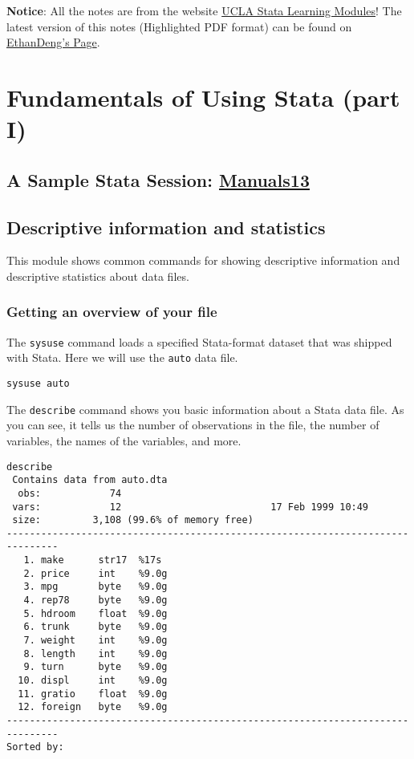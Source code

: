 \textbf{Notice}: All the notes are from the website \href{http://www.ats.ucla.edu/stat/stata/modules/}{UCLA Stata Learning Modules}! The latest version of this notes (Highlighted PDF format) can be found on \href{http://ddswhu.com/}{EthanDeng\rq{}s Page}.

\section{Fundamentals of Using Stata (part I)}

\subsection{A Sample Stata Session: \href{http://www.stata.com/manuals13/gsw1.pdf}{Manuals13}}

\subsection{Descriptive information and statistics}
This module shows common commands for showing descriptive information and descriptive statistics about data files.

\subsubsection{Getting an overview of your file}

The \lstinline{sysuse} command loads a specified Stata-format dataset that was shipped with Stata. Here we will use the \lstinline{auto} data file.

\begin{lstlisting}
sysuse auto
\end{lstlisting}

The \lstinline{describe} command shows you basic information about a Stata data file. As you can see, it tells us the number of observations in the file, the number of variables, the names of the variables, and more.

\begin{lstlisting}
describe
 Contains data from auto.dta
  obs:            74
 vars:            12                          17 Feb 1999 10:49
 size:         3,108 (99.6% of memory free)
-------------------------------------------------------------------------------
   1. make      str17  %17s
   2. price     int    %9.0g
   3. mpg       byte   %9.0g
   4. rep78     byte   %9.0g
   5. hdroom    float  %9.0g
   6. trunk     byte   %9.0g
   7. weight    int    %9.0g
   8. length    int    %9.0g
   9. turn      byte   %9.0g
  10. displ     int    %9.0g
  11. gratio    float  %9.0g
  12. foreign   byte   %9.0g
-------------------------------------------------------------------------------
Sorted by:
\end{lstlisting}

